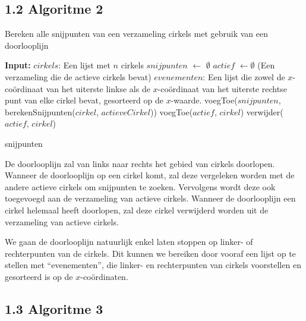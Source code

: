 \documentclass[11pt,a4paper]{report}
\begin{document}
\newpage

\subsection*{1.2 Algoritme 2}

\begin{algorithm}
\caption{Bereken alle snijpunten van een verzameling cirkels met gebruik van een doorlooplijn}
\begin{algorithmic}
	\STATE \textbf{Input:} $cirkels$: Een lijst met $n$ cirkels
	\STATE $snijpunten$ $\gets$ $\emptyset$
	\STATE $actief$ $\gets \emptyset$ (Een verzameling die de  actieve cirkels bevat)
	\STATE $evenementen$: Een lijst die zowel de $x$-co\"ordinaat van het uiterste linkse als de $x$-co\"ordinaat van het uiterste rechtse punt van elke cirkel bevat, gesorteerd op de $x$-waarde.
         \STATE voegToe($snijpunten$, berekenSnijpunten($cirkel$, $actieveCirkel$))
          \ENDFOR
         \STATE voegToe($actief$, $cirkel$)
         \STATE verwijder($actief$, $cirkel$)
         
        \ENDIF
    \ENDFOR
    \RETURN snijpunten
\end{algorithmic}
\end{algorithm}
De doorlooplijn zal van links naar rechts het gebied van cirkels doorlopen. Wanneer de doorlooplijn op een cirkel komt, zal deze vergeleken worden met de andere actieve cirkels om snijpunten te zoeken. Vervolgens wordt deze ook toegevoegd aan de verzameling van actieve cirkels. Wanneer de doorlooplijn een cirkel helemaal heeft doorlopen, zal deze cirkel verwijderd worden uit de verzameling van actieve cirkels.

We gaan de doorlooplijn natuurlijk enkel laten stoppen op linker- of rechterpunten van de cirkels. Dit kunnen we bereiken door vooraf een lijst op te stellen met ``evenementen'', die linker- en rechterpunten van cirkels voorstellen en gesorteerd is op de $x$-co\"ordinaten.

\newpage

\subsection*{1.3 Algoritme 3}
\end{document}

